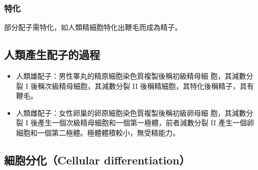 \documentclass[a4paper,12pt]{report}
\begin{document}
\subsubsection{特化}
部分配子需特化，如人類精細胞特化出鞭毛而成為精子。
\subsection{人類產生配子的過程}
\begin{itemize}
  \item 人類雄配子：男性睪丸的精原細胞染色質複製後稱初級精母細 胞，其減數分裂 I 後稱次級精母細胞，其減數分裂 II 後稱精細胞，其特化後稱精子，具有鞭毛。
  \item 人類雌配子：女性卵巢的卵原細胞染色質複製後稱初級卵母細 胞，其減數分裂 I 後產生一個次級精母細胞和一個第一極體，前者減數分裂 II 產生一個卵細胞和一個第二極體。極體體積較小，無受精能力。
\end{itemize}
\subsection{細胞分化（Cellular differentiation）}
\end{document}
